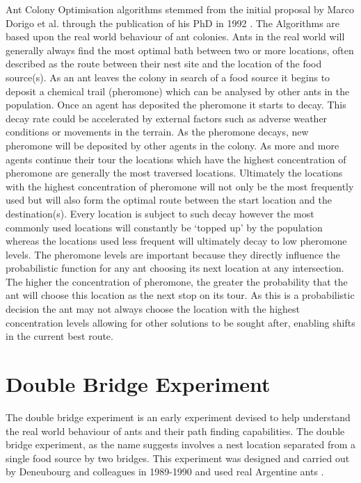 Ant Colony Optimisation algorithms stemmed from the initial proposal by Marco Dorigo et al. through the publication of his PhD in 1992 \cite{Dor1992:thesis}. The Algorithms are based upon the real world behaviour of ant colonies. Ants in the real world will generally always find the most optimal bath between two or more locations, often described as the route between their nest site and the location of the food source(s). As an ant leaves the colony in search of a food source it begins to deposit a chemical trail (pheromone) which can be analysed by other ants in the population. Once an agent has deposited the pheromone it starts to decay. This decay rate could be accelerated by external factors such as adverse weather conditions or movements in the terrain. As the pheromone decays, new pheromone will be deposited by other agents in the colony. As more and more agents continue their tour the locations which have the highest concentration of pheromone are generally the most traversed locations. Ultimately the locations with the highest concentration of pheromone will not only be the most frequently used but will also form the optimal route between the start location and the destination(s). Every location is subject to such decay however the most commonly used locations will constantly be ‘topped up’ by the population whereas the locations used less frequent will ultimately decay to low pheromone levels. The pheromone levels are important because they directly influence the probabilistic function for any ant choosing its next location at any intersection. The higher the concentration of pheromone, the greater the probability that the ant will choose this location as the next stop on its tour. As this is a probabilistic decision the ant may not always choose the location with the highest concentration levels allowing for other solutions to be sought after, enabling shifts in the current best route.

\section{Double Bridge Experiment}
\label{dblbridge}
The double bridge experiment is an early experiment devised to help understand the real world behaviour of ants and their path finding capabilities. The double bridge experiment, as the name suggests involves a nest location separated from a single food source by two bridges. This experiment was designed and carried out by Deneubourg and colleagues in 1989-1990 and used real Argentine ants \cite{marcdorgio:book:doublebridges}.

